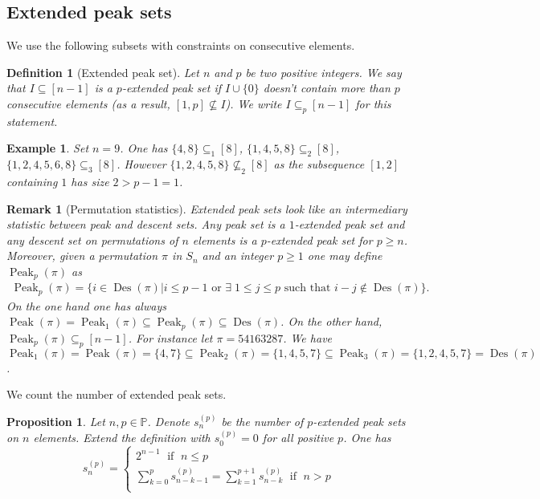 \documentclass[submission]{FPSAC2023}
\newtheorem{defn}{Definition}
\newtheorem{proposition}{Proposition}
\newtheorem{example}{Example}
\newtheorem{remark}{Remark}
\newcommand{\PP}{\mathbb{P}} %
\newcommand{\Des}{\operatorname{Des}}
\newcommand{\Peak}{\operatorname{Peak}}
\begin{document}
\subsection{Extended peak sets}
We use the following subsets with constraints on consecutive elements.
% 
\begin{defn}[Extended peak set]
Let $n$ and $p$ be two positive integers. We say that $I\subseteq [n-1]$ is a \emph{$p$-extended peak set} if $I \cup \{0\}$ doesn't contain more than $p$ consecutive elements (as a result, $[1, p] \nsubseteq I$). 
We write $I \subseteq_p [n-1]$ for this statement.
\end{defn}
%
%
\begin{example}
Set $n=9$. One has $\{4,8\} \subseteq_1 [8]$, $\{1, 4,5, 8\} \subseteq_2 [8]$, $\{1,2,4,5,6,8\} \subseteq_3 [8]$. However $\{1,2, 4,5, 8\} \nsubseteq_2 [8]$ as the subsequence $[1,2]$ containing $1$ has size $2 > p-1 = 1$.
\end{example}
%
%
\begin{remark}[Permutation statistics] Extended peak sets look like an intermediary statistic between peak and descent sets. Any peak set is a $1$-extended peak set and any descent set on permutations of $n$ elements is a $p$-extended peak set for $p\geq n$. Moreover, given a permutation $\pi$ in $S_n$ and an integer $p \geq 1$ one may define ${\Peak}_p(\pi)$ as 
\begin{align*}
{\Peak}_p(\pi) = \{i \in \Des(\pi) | i \leq p - 1 \mbox{ or } \exists \; 1 \leq j \leq p \mbox{ such that } i-j \notin \Des(\pi)\}.
\end{align*}
On the one hand one has always $\Peak(\pi) = {\Peak}_1(\pi) \subseteq {\Peak}_p(\pi) \subseteq \Des(\pi)$. On the other hand, ${\Peak}_p(\pi) \subseteq_p [n-1]$. For instance let $\pi = 54163287$. We have ${\Peak}_1(\pi) = \Peak(\pi) = \{4,7\} \subseteq {\Peak}_2(\pi)  = \{1,4,5,7\} \subseteq {\Peak}_3(\pi)  = \{1,2,4,5,7\} = \Des(\pi)$.
\end{remark}
%
We count the number of extended peak sets.
% 
\begin{proposition}
Let $n,p \in \PP$. Denote $s^{(p)}_n$ be the number of $p$-extended peak sets on $n$ elements. Extend the definition with $s^{(p)}_0 = 0$ for all positive $p$. 
One has
\begin{equation}
s^{(p)}_n = 
\begin{cases}
2^{n-1}\; \mbox{ if } \; n \leq p\\
\sum_{k=0}^{p} s^{(p)}_{n-k-1} = \sum_{k=1}^{p+1} s^{(p)}_{n-k}\; \mbox{ if } \; n > p\\
\end{cases}
\end{equation}
\end{proposition}
\end{document}
